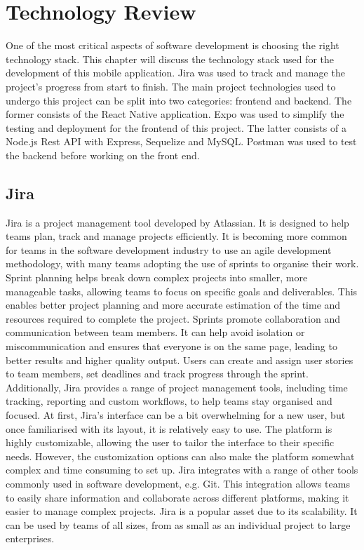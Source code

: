 \chapter{Technology Review}
One of the most critical aspects of software development is choosing the right technology stack. This chapter will discuss the technology stack used for the development of this mobile application. Jira was used to track and manage the project's progress from start to finish. The main project technologies used to undergo this project can be split into two categories: frontend and backend. The former consists of the React Native application. Expo was used to simplify the testing and deployment for the frontend of this project. The latter consists of a Node.js Rest API with Express, Sequelize and MySQL. Postman was used to test the backend before working on the front end.


\section{Jira}
Jira is a project management tool developed by Atlassian\cite{atlassian}. It is designed to help teams plan, track and manage projects efficiently. It is becoming more common for teams in the software development industry to use an agile development methodology, with many teams adopting the use of sprints to organise their work. Sprint planning helps break down complex projects into smaller, more manageable tasks, allowing teams to focus on specific goals and deliverables. This enables better project planning and more accurate estimation of the time and resources required to complete the project.  Sprints promote collaboration and communication between team members. It can help avoid isolation or miscommunication and ensures that everyone is on the same page, leading to better results and higher quality output. Users can create and assign user stories to team members, set deadlines and track progress through the sprint. Additionally, Jira provides a range of project management tools, including time tracking, reporting and custom workflows, to help teams stay organised and focused.
\newline \newline
At first, Jira’s interface can be a bit overwhelming for a new user, but once familiarised with its layout, it is relatively easy to use. The platform is highly customizable, allowing the user to tailor the interface to their specific needs. However, the customization options can also make the platform somewhat complex and time consuming to set up. Jira integrates with a range of other tools commonly used in software development, e.g. Git. This integration allows teams to easily share information and collaborate across different platforms, making it easier to manage complex projects. 
Jira is a popular asset due to its scalability. It can be used by teams of all sizes, from as small as an individual project to large enterprises. 


